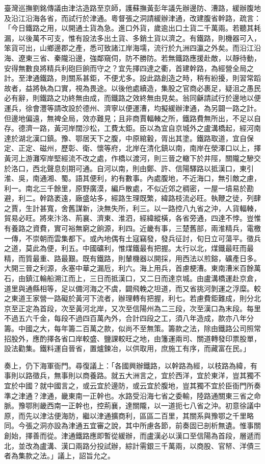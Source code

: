 \begin{pinyinscope}
臺灣巡撫劉銘傳議由津沽造路至京師，護蘇撫黃彭年議先辦邊防、漕路，緩辦腹地及沿江沿海各省，而試行於津通。粵督張之洞請緩辦津通，改建腹省幹路，疏言：「今日鐵路之用，以開通土貨為急。進口外貨，歲逾出口土貨二千萬兩。若聽其耗漏，以後萬不可支，惟有設法多出土貨、多銷土貨以濟之。有鐵路，則機器可入，笨貨可出，山鄉邊郡之產，悉可致諸江岸海壖，流行於九洲四瀛之外矣。而沿江沿海、遼東三省、秦隴沿邊，強鄰窺伺，防不勝防。若無鐵路應援赴敵，以靜待動，安得無數良將精兵利砲巨餉而守之？宜先擇四達之衢，首建幹路，為經營全局之計。至津通鐵路，則關系甚鉅，不便尤多。設此路創造之時，稍有紛擾，則習常蹈故者，益將執為口實，視為畏途。以後他處續造，集股之官商必裹足，疑沮之愚民必有辭，則鐵路之功終無由成，而鐵路之效終無由見矣。翁同龢請試行於邊地以便運兵，徐會灃等請改設於德州、濟寧以便運漕，均擬緩辦津通，為另闢一路之計。但邊地偏遠，無裨全局，效亦難見；且非商賈輻輳之所，鐵路費無所出，不足以自存。德濟一路，黃河岸闊沙松，工費太鉅。臣以為宜自京城外之盧溝橋起，經河南達於湖北漢口鎮。豫、鄂居天下之腹，中原綰轂，胥出其塗。鐵路取道，宜自保定、正定、磁州，歷彰、衛、懷等府，北岸在清化鎮以南，南岸在滎澤口以上，擇黃河上游灘窄岸堅經流不改之處，作橋以渡河，則三晉之轍下於井陘，關隴之驂交於洛口，西北聲息刻期可通。自河以南，則由鄭、許、信陽驛路以抵漢口，東引淮、吳，南通湘、蜀。語其便利，約有數事。內處腹地，不近海口，無引敵之慮，利一。南北三千餘里，原野廣漠，編戶散處，不似近郊之稠密，一屋一墳易於勘避，利二。幹路袤遠，廠盛站多，經路生理既繁，緯路枝流必旺。執鞭之徒，列肆之賈，生計甚寬，舍舊謀新，決無失所，利三。以一路控八九省之沖，人貨輻輳，貿易必旺。將來汴洛、荊襄、濟東、淮泗，經緯縱橫，各省旁通，四達不悖。豈惟有養路之資費，實可裕無窮之餉源，利四。近畿有事，三楚舊部，兩淮精兵，電檄一傳，不崇朝而雲集都下。或內地偶有土寇竊發，發兵征討，旬日立可蕩平。徵兵之道，莫此為便，利五。中國礦利，惟煤鐵最有把握。太行以北，煤鐵最旺而最精，而質最重、路最艱。既有鐵路，則輦機器以開採，用西法以煎鎔，礦產日多。大開三晉之利源，永塞中華之漏卮，利六。海上用兵，首慮梗漕。東南漕米百餘萬石，由鎮江輪船溯江而上，三日而抵漢口，又二日而達京城。由盧溝橋運赴京倉，道里與通縣相等，足以備河海之不虞，闢飛輓之坦道，而又省挑河剝運之浮糜。較之東道王家營一路礙於黃河下流者，辦理轉有把握，利七。若慮費鉅難成，則分北京至正定為首段，次至黃河北岸，又次至信陽州為二三段，次至漢口為末段。每里不過五六千金，每段不過四百萬內外，合計四段之工，須八年造成，款亦八年分籌。中國之大，每年籌二百萬之款，似尚不至無策。籌款之法，除由鐵路公司照常招股外，應酌擇各省口岸較盛、鹽課較旺之地，由籓運兩司、關道轉發印票股單，設法勸集。鐵料運自晉省，置爐鍊冶，以供取用，庶施工有序，而藏富在民。」

奏上，仍下海軍衙門。尋復議上：「各國興辦鐵路，以幹路為經，以枝路為緯，有事則以路徵兵，無事則以商養路。就五大洲言之，宜於西洋，宜於東洋，豈其獨不宜於中國？就中國言之，或云宜於邊防，或云宜於腹地，豈其獨不宜於臣衙門所奏準之津通？津通，畿東南一正幹也。水路受沿海七省之委輸，陸路通關東三省之命脈。豫鄂則畿西南一正幹也，控荊襄，達關隴，以一道扼七八省之沖。初意徐議中原，而先以津沽便海防，繼以津通擴商利，區區二百里，其關系與豫鄂之千里略同。今張之洞亦設為津通五宜審之說，其中所慮各節，前奏固已剖析無遺。惟事關創始，擇善而從。津通鐵路應即暫從緩辦，而盧漢必以漢口至信陽為首段，層遞而北，並改為盧溝、漢口兩路分投試辦，綜計需銀三千萬兩，以商股、官帑、洋債三者為集款之法。」議上，詔旨允之。


\end{pinyinscope}
